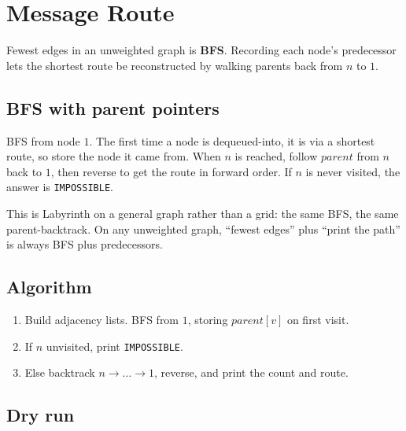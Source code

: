 \section{Message Route}
\label{sec:cses-message-route}


\begin{patternbox}
Fewest edges in an unweighted graph is \textbf{BFS}. Recording each node's
predecessor lets the shortest route be reconstructed by walking parents
back from $n$ to $1$.
\end{patternbox}

\subsection*{BFS with parent pointers}

BFS from node $1$. The first time a node is dequeued-into, it is via a
shortest route, so store the node it came from. When $n$ is reached, follow
$\textit{parent}$ from $n$ back to $1$, then reverse to get the route in
forward order. If $n$ is never visited, the answer is \texttt{IMPOSSIBLE}.

\begin{ideabox}
This is Labyrinth on a general graph rather than a grid: the same BFS,
the same parent-backtrack. On any unweighted graph, ``fewest edges''
plus ``print the path'' is always BFS plus predecessors.
\end{ideabox}

\subsection*{Algorithm}

\begin{enumerate}
  \item Build adjacency lists. BFS from $1$, storing $\textit{parent}[v]$
        on first visit.
  \item If $n$ unvisited, print \texttt{IMPOSSIBLE}.
  \item Else backtrack $n\to\ldots\to1$, reverse, and print the count and
        route.
\end{enumerate}

\subsection*{Dry run}

